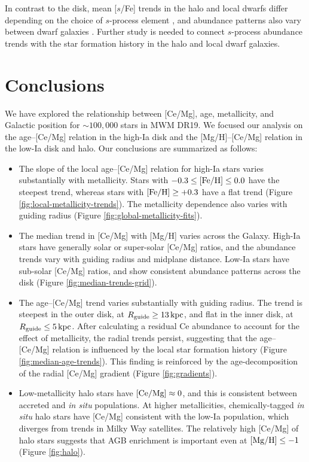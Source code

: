 \documentclass[twocolumn,twocolappendix]{aastex701}
\newcommand{\bracket}[2][H]{{\rm [#2/#1]}}
\newcommand{\kpc}{\,{\rm kpc}}
\begin{document}
In contrast to the disk, mean [$s$/Fe] trends in the halo and local dwarfs differ depending on the choice of $s$-process element \citep{van_der_swaelmen_chemical_2013,skuladottir_neutron-capture_2020,carrillo_detailed_2022}, and abundance patterns also vary between dwarf galaxies \citep[e.g.,][]{shetrone_apache_2026}. Further study is needed to connect $s$-process abundance trends with the star formation history in the halo and local dwarf galaxies.

\section{Conclusions}
\label{sec:conclusions}

We have explored the relationship between [Ce/Mg], age, metallicity, and Galactic position for $\sim100,000$ stars in MWM DR19. We focused our analysis on the age--[Ce/Mg] relation in the high-Ia disk and the [Mg/H]--[Ce/Mg] relation in the low-Ia disk and halo. Our conclusions are summarized as follows:

\begin{itemize}
    \item The slope of the local age--[Ce/Mg] relation for high-Ia stars varies substantially with metallicity. Stars with $-0.3\leq\bracket{Fe}\leq0.0$ have the steepest trend, whereas stars with $\bracket{Fe}\ge+0.3$ have a flat trend (Figure \ref{fig:local-metallicity-trends}). The metallicity dependence also varies with guiding radius (Figure \ref{fig:global-metallicity-fits}).
    \item The median trend in [Ce/Mg] with [Mg/H] varies across the Galaxy. High-Ia stars have generally solar or super-solar [Ce/Mg] ratios, and the abundance trends vary with guiding radius and midplane distance. Low-Ia stars have sub-solar [Ce/Mg] ratios, and show consistent abundance patterns across the disk (Figure \ref{fig:median-trends-grid}).
    \item The age--[Ce/Mg] trend varies substantially with guiding radius. The trend is steepest in the outer disk, at $R_{\rm guide}\ge13\kpc$, and flat in the inner disk, at $R_{\rm guide}\le5\kpc$. After calculating a residual Ce abundance to account for the effect of metallicity, the radial trends persist, suggesting that the age--[Ce/Mg] relation is influenced by the local star formation history (Figure \ref{fig:median-age-trends}). This finding is reinforced by the age-decomposition of the radial [Ce/Mg] gradient (Figure \ref{fig:gradients}).
    \item Low-metallicity halo stars have $\bracket[Mg]{Ce}\approx0$, and this is consistent between accreted and {\it in situ} populations. At higher metallicities, chemically-tagged {\it in situ} halo stars have [Ce/Mg] consistent with the low-Ia population, which diverges from trends in Milky Way satellites. The relatively high [Ce/Mg] of halo stars suggests that AGB enrichment is important even at $\bracket{Mg}\leq-1$ (Figure \ref{fig:halo}).
\end{itemize}
\end{document}
